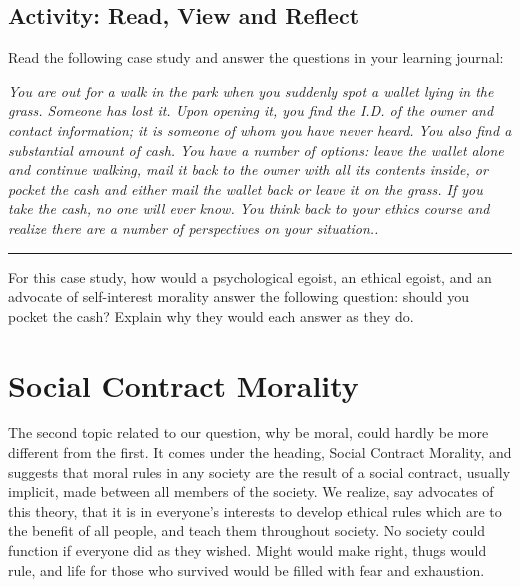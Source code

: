 \documentclass[
]{book}
\begin{document}
\hypertarget{activity-read-view-and-reflect-2}{%
\subsection*{Activity: Read, View and Reflect}\label{activity-read-view-and-reflect-2}}

\begin{reflect}
Read the following case study and answer the questions in your learning journal:

\emph{You are out for a walk in the park when you suddenly spot a wallet lying in the grass. Someone has lost it. Upon opening it, you find the I.D. of the owner and contact information; it is someone of whom you have never heard. You also find a substantial amount of cash. You have a number of options: leave the wallet alone and continue walking, mail it back to the owner with all its contents inside, or pocket the cash and either mail the wallet back or leave it on the grass. If you take the cash, no one will ever know. You think back to your ethics course and realize there are a number of perspectives on your situation..}

\begin{center}\rule{0.5\linewidth}{0.5pt}\end{center}

For this case study, how would a psychological egoist, an ethical egoist, and an advocate of self-interest morality answer the following question: should you pocket the cash? Explain why they would each answer as they do.
\end{reflect}

\hypertarget{social-contract-morality}{%
\section{Social Contract Morality}\label{social-contract-morality}}

The second topic related to our question, why be moral, could hardly be more different from the first. It comes under the heading, Social Contract Morality, and suggests that moral rules in any society are the result of a social contract, usually implicit, made between all members of the society. We realize, say advocates of this theory, that it is in everyone's interests to develop ethical rules which are to the benefit of all people, and teach them throughout society. No society could function if everyone did as they wished. Might would make right, thugs would rule, and life for those who survived would be filled with fear and exhaustion.
\end{document}
